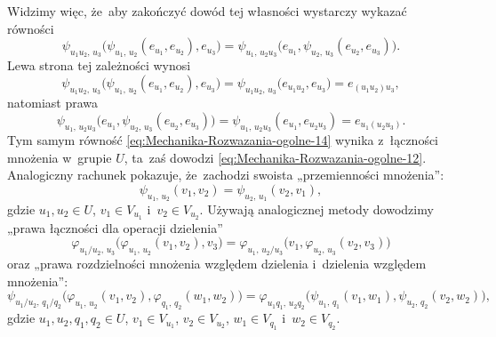 \documentclass[a4paper,11pt]{article}
\numberwithin{equation}{section}
\begin{document}
Widzimy więc, że~aby zakończyć dowód tej własności wystarczy wykazać
równości
\begin{equation}
  \label{eq:Mechanika-Rozwazania-ogolne-14}
  \psi_{ u_{ 1 } u_{ 2 }, \, u_{ 3 } }\big(
  \psi_{ u_{ 1 }, \, u_{ 2 } }( e_{ u_{ 1 } }, e_{ u_{ 2 } } ), e_{ u_{ 3 } }
  \big) =
  \psi_{ u_{ 1 }, \, u_{ 2 } u_{ 3 } }\big(
  e_{ u_{ 1 } }, \psi_{ u_{ 2 }, \, u_{ 3 } }( e_{ u_{ 2 } }, e_{ u_{ 3 } } )
  \big).
\end{equation}
Lewa strona tej zależności wynosi
\begin{equation}
  \label{eq:Mechanika-Rozwazania-ogolne-15}
  \psi_{ u_{ 1 } u_{ 2 }, \, u_{ 3 } }\big(
  \psi_{ u_{ 1 }, \, u_{ 2 } }( e_{ u_{ 1 } }, e_{ u_{ 2 } } ), e_{ u_{ 3 } }
  \big) =
  \psi_{ u_{ 1 } u_{ 2 }, \, u_{ 3 } }\big( e_{ u_{ 1 } u_{ 2 } }, e_{ u_{ 3 } }
  \big) =
  e_{ ( u_{ 1 } u_{ 2 } ) u_{ 3 } },
\end{equation}
natomiast prawa
\begin{equation}
  \label{eq:Mechanika-Rozwazania-ogolne-16}
  \psi_{ u_{ 1 }, \, u_{ 2 } u_{ 3 } }\big(
  e_{ u_{ 1 } }, \psi_{ u_{ 2 }, \, u_{ 3 } }( e_{ u_{ 2 } }, e_{ u_{ 3 } } )
  \big) =
  \psi_{ u_{ 1 }, \, u_{ 2 } u_{ 3 } }( e_{ u_{ 1 } }, e_{ u_{ 2 } u_{ 3 } } ) =
  e_{ u_{ 1 } ( u_{ 2 } u_{ 3 } ) }.
\end{equation}
Tym samym równość \eqref{eq:Mechanika-Rozwazania-ogolne-14} wynika
z~łączności mnożenia w~grupie $U$, ta~zaś dowodzi
\eqref{eq:Mechanika-Rozwazania-ogolne-12}. Analogiczny rachunek pokazuje,
że~zachodzi swoista „przemienności mnożenia”:
\begin{equation}
  \label{eq:Mechanika-Rozwazania-ogolne-17}
  \psi_{ u_{ 1 }, \, u_{ 2 } }( v_{ 1 }, v_{ 2 } ) =
  \psi_{ u_{ 2 }, \, u_{ 1 } }( v_{ 2 }, v_{ 1 } ),
\end{equation}
gdzie $u_{ 1 }, u_{ 2 } \in U$, $v_{ 1 } \in V_{ u_{ 1 } }$
i~$v_{ 2 } \in V_{ u_{ 2 } }$. Używają analogicznej metody dowodzimy
„prawa łączności dla operacji dzielenia”
\begin{equation}
  \label{eq:Mechanika-Rozwazania-ogolne-18}
  \varphi_{ u_{ 1 } / u_{ 2 }, \, u_{ 3 } }\big(
  \varphi_{ u_{ 1 }, \, u_{ 2 } }( v_{ 1 }, v_{ 2 } ), v_{ 3 } \big) =
  \varphi_{ u_{ 1 }, \, u_{ 2 } / u_{ 3 } }\big(
  v_{ 1 }, \varphi_{ u_{ 2 }, \, u_{ 3 } }( v_{ 2 }, v_{ 3 } ) \big)
\end{equation}
oraz „prawa rozdzielności mnożenia względem dzielenia i~dzielenia
względem mnożenia”:
\begin{equation}
  \label{eq:Mechanika-Rozwazania-ogolne-19}
  \psi_{ u_{ 1 } / u_{ 2 }, \, q_{ 1 } / q_{ 2 } }\big(
  \varphi_{ u_{ 1 }, \, u_{ 2 } }( v_{ 1 }, v_{ 2 } ),
  \varphi_{ q_{ 1 }, \, q_{ 2 } }( w_{ 1 }, w_{ 2 } ) \big) =
  \varphi_{ u_{ 1 } q_{ 1 }, \, u_{ 2 } q_{ 2 } }\big(
  \psi_{ u_{ 1 }, \, q_{ 1 } }( v_{ 1 }, w_{ 1 } ),
  \psi_{ u_{ 2 }, \, q_{ 2 } }( v_{ 2 }, w_{ 2 } ) \big),
\end{equation}
gdzie $u_{ 1 }, u_{ 2 }, q_{ 1 }, q_{ 2 } \in U$, $v_{ 1 } \in V_{ u_{ 1 } }$,
$v_{ 2 } \in V_{ u_{ 2 } }$, $w_{ 1 } \in V_{ q_{ 1 } }$ i~$w_{ 2 } \in V_{ q_{ 2 } }$.
\end{document}
